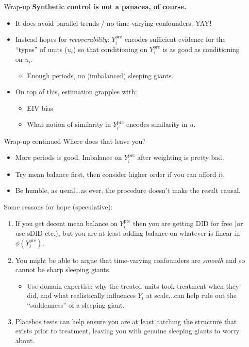 \documentclass[xcolor=dvipsnames]{beamer}
\newcommand\makegaps{\addtolength{\itemsep}{.25\baselineskip}}
\newcommand{\ypre}{Y^{\text{pre}}_i}      %
\begin{document}
\begin{frame}{Wrap-up}
\textbf{Synthetic control is not a panacea, of course.}\\[1ex]
\begin{itemize}\makegaps
\item<2-> It does avoid parallel trends / no time-varying confounders. YAY!
\item<3-> Instead hopes for \textit{recoverability}: $\ypre$ encodes sufficient evidence for the ``types'' of units ($u_i$) so that conditioning on $\ypre$ is as good as conditioning on $u_i$.
\begin{itemize}
\item Enough periods, no (imbalanced) sleeping giants.
\end{itemize}
\item<4-> On top of this, estimation grapples with: 
\begin{itemize}
\item EIV bias
\item  What notion of similarity in $\ypre$ encodes similarity in $u$.
\end{itemize}
\end{itemize}
\end{frame}

\begin{frame}{Wrap-up continued}
 Where does that leave you?\\
\footnotesize
\begin{itemize}\makegaps
\item<1-> More periods is good. Imbalance on $\ypre$ after weighting is pretty bad.
\item<2-> Try mean balance first, then consider higher order if you can afford it. 
\item<3-> Be humble, as usual...as ever, the procedure doesn't make the result causal.
\end{itemize}
\normalsize
\medskip
{} Some reasons for hope (speculative):\\
\footnotesize
\begin{enumerate}
\item<3-> If you get decent mean balance on $\ypre$ then you are getting DID for free (or use sDID etc.), but you are at least adding balance on whatever is linear in $\phi(\ypre)$.
\item<4-> You might be able to argue that time-varying confounders are \textit{smooth} and so cannot be sharp sleeping giants. 
\begin{itemize} 
  \footnotesize
  \item Use domain expertise: why the treated units took treatment when they did, and what realistically influences $Y_t$ at scale...can help rule out the ``suddenness'' of a sleeping giant.
\end{itemize}
\item<5-> Placebos tests can help ensure you are at least catching the structure that exists prior to treatment, leaving you with genuine sleeping giants to worry about. 
\end{enumerate}
\end{frame}
\end{document}

